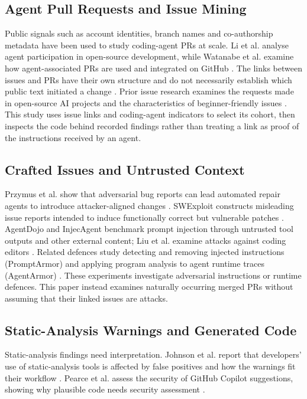 \documentclass[acmsmall,screen,nonacm]{acmart}
\begin{document}
\subsection{Agent Pull Requests and Issue Mining}

Public signals such as account identities, branch names and co-authorship metadata have been used to study coding-agent PRs at scale. Li et al. analyse agent participation in open-source development, while Watanabe et al. examine how agent-associated PRs are used and integrated on GitHub \cite{b11,b21}. The links between issues and PRs have their own structure and do not necessarily establish which public text initiated a change \cite{b5}. Prior issue research examines the requests made in open-source AI projects and the characteristics of beginner-friendly issues \cite{b23,b26}. This study uses issue links and coding-agent indicators to select its cohort, then inspects the code behind recorded findings rather than treating a link as proof of the instructions received by an agent.

\subsection{Crafted Issues and Untrusted Context}

Przymus et al. show that adversarial bug reports can lead automated repair agents to introduce attacker-aligned changes \cite{b16}. SWExploit constructs misleading issue reports intended to induce functionally correct but vulnerable patches \cite{b3}. AgentDojo and InjecAgent benchmark prompt injection through untrusted tool outputs and other external content; Liu et al. examine attacks against coding editors \cite{b6,b24,b12}. Related defences study detecting and removing injected instructions (PromptArmor) and applying program analysis to agent runtime traces (AgentArmor) \cite{b45,b46}. These experiments investigate adversarial instructions or runtime defences. This paper instead examines naturally occurring merged PRs without assuming that their linked issues are attacks.

\subsection{Static-Analysis Warnings and Generated Code}

Static-analysis findings need interpretation. Johnson et al. report that developers' use of static-analysis tools is affected by false positives and how the warnings fit their workflow \cite{b33}. Pearce et al. assess the security of GitHub Copilot suggestions, showing why plausible code needs security assessment \cite{b35}.
\end{document}
